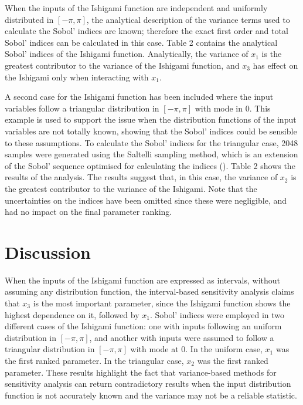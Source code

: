 \documentclass[twocolumn]{rps-esrel2022}
\begin{document}
When the inputs of the Ishigami function are independent and uniformly distributed in $[-\pi,\pi]$, the analytical description of the variance
terms used to calculate the Sobol' indices are known; therefore the exact first order and total Sobol' indices can be calculated in this case.
Table 2 contains the analytical Sobol' indices of the Ishigami function.
Analytically, the variance of $x_1$ is the greatest contributor to the variance of the Ishigami function, and $x_3$ has effect on the Ishigami
only when interacting with $x_1$.

A second case for the Ishigami function has been included where the input variables follow a triangular distribution in $[-\pi,\pi]$ with mode in $0$. This example is used to support the issue when the distribution functions of the input variables are not totally known, showing
that the Sobol' indices could be sensible to these assumptions.
To calculate the Sobol' indices for the triangular case, 2048 samples were generated using the Saltelli sampling method, which is an extension of the Sobol'
sequence optimised for calculating the indices (\cite{saltelli2002making}).
Table 2 shows the results of the analysis.
The results suggest that, in this case, the variance of $x_2$ is the greatest contributor to the variance of the Ishigami.
Note that the uncertainties on the indices have been omitted since these were negligible, and had no impact on the final parameter ranking.


\section{Discussion}

When the inputs of the Ishigami function are expressed as intervals, without assuming any distribution function,
the interval-based sensitivity analysis claims that $x_3$ is the most important parameter, since the Ishigami function
shows the highest dependence on it, followed by $x_1$.
Sobol' indices were employed in two different cases of the Ishigami function: one with inputs following an uniform distribution in $[-\pi,\pi]$, and another with inputs were assumed to follow a triangular distribution
in $[-\pi,\pi]$ with mode at $0$.
In the uniform case, $x_1$ was the first ranked parameter. In the triangular case, $x_2$ was the first ranked parameter.
These results highlight the fact that variance-based methods for sensitivity analysis can return contradictory results when the input distribution function is not accurately known and the variance may not be a reliable statistic.
\end{document}
